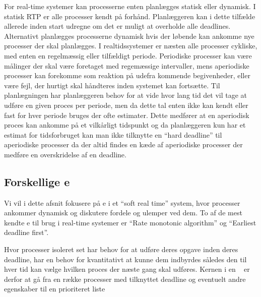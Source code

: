 For real-time systemer kan processerne enten planlægges statisk eller dynamisk\cite{cheng1987scheduling}. I statisk RTP er alle processer kendt på forhånd. Planlæggeren kan i dette tilfælde allerede inden start udregne om det er muligt at overholde alle deadlines. Alternativt planlægges processerne dynamisk hvis der løbende kan ankomme nye  processer der skal planlægges. I realtidssystemer er næsten alle processer cykliske, med enten en regelmæssig eller tilfældigt periode. Periodiske processer kan være målinger der skal være foretaget med regemæssige intervaller, mens aperiodiske processer kan forekomme som reaktion på udefra kommende begivenheder, eller være fejl, der hurtigt skal håndteres inden systemet kan fortsætte.
Til planlægningen har planlæggeren behov for at vide hvor lang tid det vil tage at udføre en given proces per periode, men da dette tal enten ikke kan kendt eller fast for hver periode bruges der ofte estimater. Dette medfører at en aperiodisk proces kan ankomme på et vilkårligt tidspunkt og da planlæggeren kun har et estimat for tidsforbruget kan man  ikke tilknytte en ``hard deadline'' til aperiodiske processer da der altid findes en kæde af aperiodiske processer der medføre en overskridelse af en deadline. 

\subsection{Forskellige \sched e}
Vi vil i dette afsnit fokusere på \sched e i et ``soft real time'' system,   hvor processer ankommer dynamisk og diskutere fordele og ulemper ved dem.
To af de mest kendte \sched e til brug i real-time systemer er ``Rate monotonic algorithm''\cite{lehoczky1989rate,liu1973scheduling} og ``Earliest deadline first''\cite{liu1973scheduling}.

Hvor processer isoleret set har behov for at udføre deres opgave inden deres deadline, har \sched en behov for kvantitativt at kunne  dem indbyrdes således den til hver tid kan vælge hvilken proces der næste gang skal udføres. Kernen i en  \sched ~ er derfor at gå fra en række processer med tilknyttet deadline og eventuelt andre egenskaber til en prioriteret liste 

